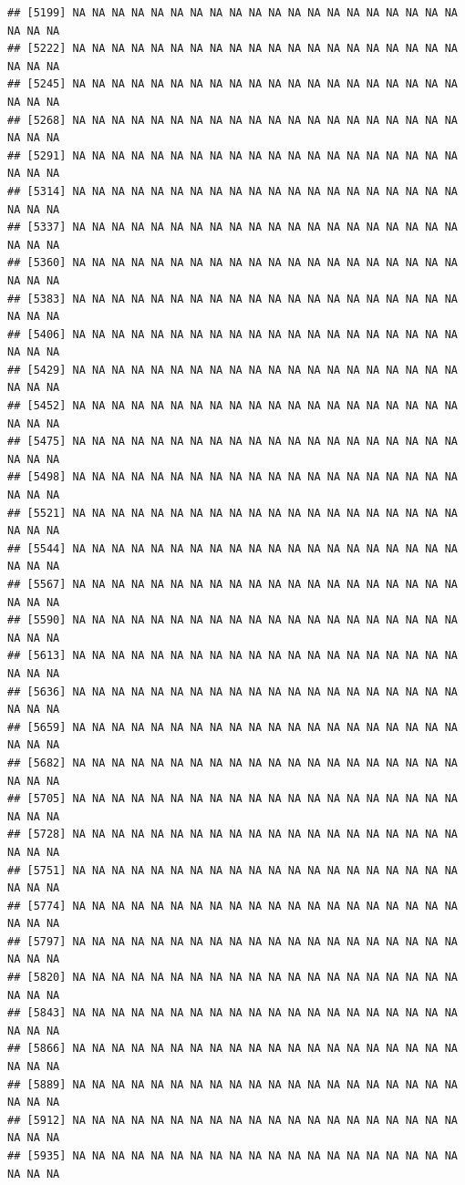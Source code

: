 \documentclass{article}\usepackage[]{graphicx}\usepackage[]{color}
\makeatletter
\newenvironment{kframe}{%
 \def\at@end@of@kframe{}%
 \ifinner\ifhmode%
  \def\at@end@of@kframe{\end{minipage}}%
  \begin{minipage}{\columnwidth}%
 \fi\fi%
 \def\FrameCommand##1{\hskip\@totalleftmargin \hskip-\fboxsep
 \colorbox{shadecolor}{##1}\hskip-\fboxsep
     \hskip-\linewidth \hskip-\@totalleftmargin \hskip\columnwidth}%
 \MakeFramed {\advance\hsize-\width
   \@totalleftmargin\z@ \linewidth\hsize
   \@setminipage}}%
 {\par\unskip\endMakeFramed%
 \at@end@of@kframe}
\newenvironment{knitrout}{}{} %
\makeatother
\begin{document}
\begin{knitrout}
\begin{kframe}
\begin{verbatim}
## [5199] NA NA NA NA NA NA NA NA NA NA NA NA NA NA NA NA NA NA NA NA NA NA NA
## [5222] NA NA NA NA NA NA NA NA NA NA NA NA NA NA NA NA NA NA NA NA NA NA NA
## [5245] NA NA NA NA NA NA NA NA NA NA NA NA NA NA NA NA NA NA NA NA NA NA NA
## [5268] NA NA NA NA NA NA NA NA NA NA NA NA NA NA NA NA NA NA NA NA NA NA NA
## [5291] NA NA NA NA NA NA NA NA NA NA NA NA NA NA NA NA NA NA NA NA NA NA NA
## [5314] NA NA NA NA NA NA NA NA NA NA NA NA NA NA NA NA NA NA NA NA NA NA NA
## [5337] NA NA NA NA NA NA NA NA NA NA NA NA NA NA NA NA NA NA NA NA NA NA NA
## [5360] NA NA NA NA NA NA NA NA NA NA NA NA NA NA NA NA NA NA NA NA NA NA NA
## [5383] NA NA NA NA NA NA NA NA NA NA NA NA NA NA NA NA NA NA NA NA NA NA NA
## [5406] NA NA NA NA NA NA NA NA NA NA NA NA NA NA NA NA NA NA NA NA NA NA NA
## [5429] NA NA NA NA NA NA NA NA NA NA NA NA NA NA NA NA NA NA NA NA NA NA NA
## [5452] NA NA NA NA NA NA NA NA NA NA NA NA NA NA NA NA NA NA NA NA NA NA NA
## [5475] NA NA NA NA NA NA NA NA NA NA NA NA NA NA NA NA NA NA NA NA NA NA NA
## [5498] NA NA NA NA NA NA NA NA NA NA NA NA NA NA NA NA NA NA NA NA NA NA NA
## [5521] NA NA NA NA NA NA NA NA NA NA NA NA NA NA NA NA NA NA NA NA NA NA NA
## [5544] NA NA NA NA NA NA NA NA NA NA NA NA NA NA NA NA NA NA NA NA NA NA NA
## [5567] NA NA NA NA NA NA NA NA NA NA NA NA NA NA NA NA NA NA NA NA NA NA NA
## [5590] NA NA NA NA NA NA NA NA NA NA NA NA NA NA NA NA NA NA NA NA NA NA NA
## [5613] NA NA NA NA NA NA NA NA NA NA NA NA NA NA NA NA NA NA NA NA NA NA NA
## [5636] NA NA NA NA NA NA NA NA NA NA NA NA NA NA NA NA NA NA NA NA NA NA NA
## [5659] NA NA NA NA NA NA NA NA NA NA NA NA NA NA NA NA NA NA NA NA NA NA NA
## [5682] NA NA NA NA NA NA NA NA NA NA NA NA NA NA NA NA NA NA NA NA NA NA NA
## [5705] NA NA NA NA NA NA NA NA NA NA NA NA NA NA NA NA NA NA NA NA NA NA NA
## [5728] NA NA NA NA NA NA NA NA NA NA NA NA NA NA NA NA NA NA NA NA NA NA NA
## [5751] NA NA NA NA NA NA NA NA NA NA NA NA NA NA NA NA NA NA NA NA NA NA NA
## [5774] NA NA NA NA NA NA NA NA NA NA NA NA NA NA NA NA NA NA NA NA NA NA NA
## [5797] NA NA NA NA NA NA NA NA NA NA NA NA NA NA NA NA NA NA NA NA NA NA NA
## [5820] NA NA NA NA NA NA NA NA NA NA NA NA NA NA NA NA NA NA NA NA NA NA NA
## [5843] NA NA NA NA NA NA NA NA NA NA NA NA NA NA NA NA NA NA NA NA NA NA NA
## [5866] NA NA NA NA NA NA NA NA NA NA NA NA NA NA NA NA NA NA NA NA NA NA NA
## [5889] NA NA NA NA NA NA NA NA NA NA NA NA NA NA NA NA NA NA NA NA NA NA NA
## [5912] NA NA NA NA NA NA NA NA NA NA NA NA NA NA NA NA NA NA NA NA NA NA NA
## [5935] NA NA NA NA NA NA NA NA NA NA NA NA NA NA NA NA NA NA NA NA NA NA NA

\end{verbatim}
\end{kframe}
\end{knitrout}
\end{document}
